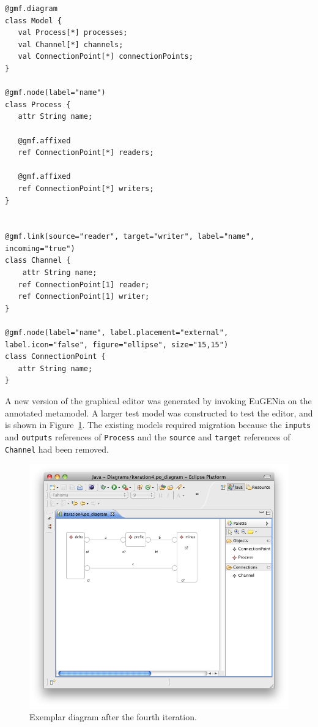 \begin{lstlisting}[caption=The annotated process-oriented metamodel after four iterations, label=lst:po_it4_mm, language=Emfatic]
@gmf.diagram
class Model {
   val Process[*] processes;
   val Channel[*] channels;
   val ConnectionPoint[*] connectionPoints;
}

@gmf.node(label="name")
class Process {
   attr String name;
      
   @gmf.affixed
   ref ConnectionPoint[*] readers;
   
   @gmf.affixed
   ref ConnectionPoint[*] writers; 
}


@gmf.link(source="reader", target="writer", label="name", incoming="true")
class Channel { 
	attr String name;
   ref ConnectionPoint[1] reader;
   ref ConnectionPoint[1] writer;
}

@gmf.node(label="name", label.placement="external", label.icon="false", figure="ellipse", size="15,15")
class ConnectionPoint {
   attr String name;
}
\end{lstlisting}

A new version of the graphical editor was generated by invoking EuGENia on the annotated metamodel. A larger test model was constructed to test the editor, and is shown in Figure~\ref{fig:po_it4_model}. The existing models required migration because the \texttt{in\-pu\-ts} and \texttt{ou\-tp\-u\-ts} references of \texttt{Pr\-oc\-e\-ss} and the \texttt{s\-ou\-r\-ce} and \texttt{ta\-rg\-et} references of \texttt{Channel} had been removed.

\begin{figure}[htbp]
	\centering
		\includegraphics[scale=0.5]{A.2.ProcessOriented/images/4_model.png}
	\caption{Exemplar diagram after the fourth iteration.}
	\label{fig:po_it4_model}
\end{figure}

